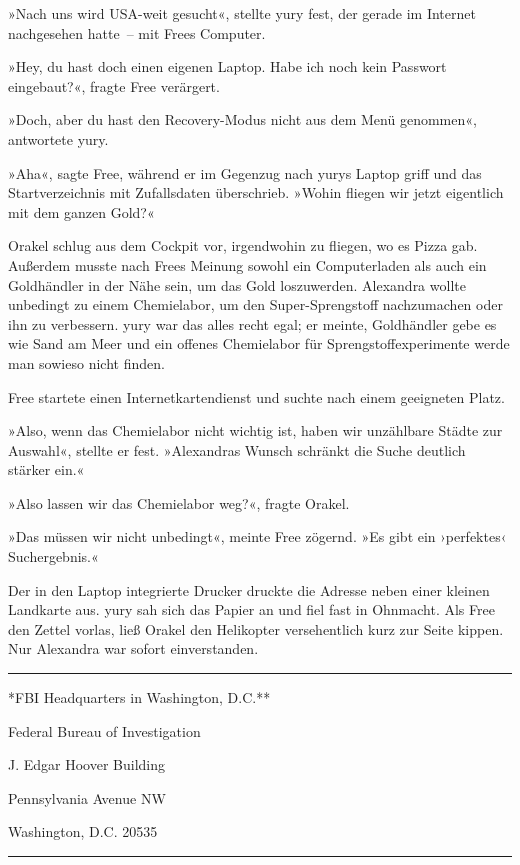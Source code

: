 »Nach uns wird USA-weit gesucht«, stellte yury fest, der gerade im Internet nachgesehen hatte~– mit Frees Computer.

»Hey, du hast doch einen eigenen Laptop. Habe ich noch kein Passwort eingebaut?«, fragte Free verärgert.

»Doch, aber du hast den Recovery-Modus nicht aus dem Menü genommen«, antwortete yury.

»Aha«, sagte Free, während er im Gegenzug nach yurys Laptop griff und das Startverzeichnis mit Zufallsdaten überschrieb. »Wohin fliegen wir jetzt eigentlich mit dem ganzen Gold?«

Orakel schlug aus dem Cockpit vor, irgendwohin zu fliegen, wo es Pizza gab. Außerdem musste nach Frees Meinung sowohl ein Computerladen als auch ein Goldhändler in der Nähe sein, um das Gold loszuwerden. Alexandra wollte unbedingt zu einem Chemielabor, um den Super-Sprengstoff nachzumachen oder ihn zu verbessern. yury war das alles recht egal; er meinte, Goldhändler gebe es wie Sand am Meer und ein offenes Chemielabor für Sprengstoffexperimente werde man sowieso nicht finden.

Free startete einen Internetkartendienst und suchte nach einem geeigneten Platz.

»Also, wenn das Chemielabor nicht wichtig ist, haben wir unzählbare Städte zur Auswahl«, stellte er fest. »Alexandras Wunsch schränkt die Suche deutlich stärker ein.«

»Also lassen wir das Chemielabor weg?«, fragte Orakel.

»Das müssen wir nicht unbedingt«, meinte Free zögernd. »Es gibt ein ›perfektes‹ Suchergebnis.«

Der in den Laptop integrierte Drucker druckte die Adresse neben einer kleinen Landkarte aus. yury sah sich das Papier an und fiel fast in Ohnmacht. Als Free den Zettel vorlas, ließ Orakel den Helikopter versehentlich kurz zur Seite kippen. Nur Alexandra war sofort einverstanden.

\noindent \parbox{\textwidth}{ \vspace{3ex} \hrule \vspace{3ex}

    \begin{footnotesize}
    \begin{ttfamily}

\noindent **FBI Headquarters in Washington, D.C.**

\noindent Federal Bureau of Investigation

\noindent J. Edgar Hoover Building

 Pennsylvania Avenue NW

\noindent Washington, D.C. 20535

    \end{ttfamily}
    \end{footnotesize}

\vspace{3ex} \hrule \vspace{3ex} }

